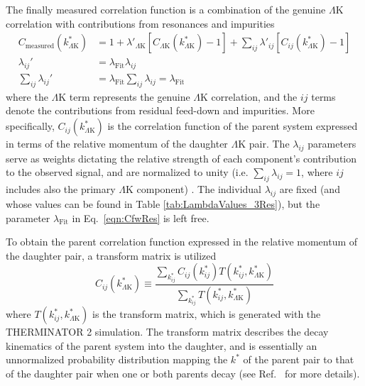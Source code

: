 \documentclass[ALICE,manyauthors]{cernphprep}
\newcommand{\kstar}{$k^{*}$\xspace}
\newcommand{\LamK}{$\Lambda$K\xspace}
\begin{document}
The finally measured correlation function is a combination of the genuine \LamK correlation with contributions from resonances and impurities \cite{Kisiel:2014mma}
\begin{equation}
\begin{aligned}
\label{eqn:CfwRes} 
 C_{\mathrm{measured}}(k^{*}_{\Lambda\mathrm{K}}) &= 1 + \lambda'_{\Lambda\mathrm{K}}[C_{\Lambda\mathrm{K}}(k^{*}_{\Lambda\mathrm{K}}) - 1] + \sum\limits_{ij}  \lambda'_{ij}[C_{ij}(k^{*}_{\Lambda\mathrm{K}})-1] \\
 \lambda_{ij}' &= \lambda_{\mathrm{Fit}}\lambda_{ij} \\
 \sum\limits_{ij}\lambda_{ij}' &=  \lambda_{\mathrm{Fit}}\sum\limits_{ij}\lambda_{ij} = \lambda_{\mathrm{Fit}}
\end{aligned} 
\end{equation}
where the \LamK term represents the genuine \LamK correlation, and the $ij$ terms denote the contributions from residual feed-down and impurities.
More specifically, $C_{ij}(k^{*}_{\Lambda\mathrm{K}})$ is the correlation function of the parent system expressed in terms of the relative momentum of the daughter \LamK pair.  
The $\lambda_{ij}$ parameters serve as weights dictating the relative strength of each component's contribution to the observed signal, and are normalized to unity (i.e. $\sum_{ij} \lambda_{ij} = 1$, where $ij$ includes also the primary \LamK component) {}.
The individual $\lambda_{ij}$ are fixed (and whose values can be found in Table \ref{tab:LambdaValues_3Res}), but the parameter $\lambda_{\mathrm{Fit}}$ in Eq.\ \ref{eqn:CfwRes} is left free.


To obtain the parent correlation function expressed in the relative momentum of the daughter pair, a transform matrix is utilized
\begin{equation}
  C_{ij}(k^{*}_{\Lambda\mathrm{K}}) \equiv \frac{\sum\limits_{k^{*}_{ij}} C_{ij}\left(k^{*}_{ij}\right) T\left(k^{*}_{ij},k^{*}_{\Lambda\mathrm{K}}\right)}{\sum\limits_{k^{*}_{ij}} T\left(k^{*}_{ij},k^{*}_{\Lambda\mathrm{K}}\right)}
\label{eqn:ResidualsTransform}
\end{equation}
where $T(k^{*}_{ij},k^{*}_{\Lambda\mathrm{K}})$ is the transform matrix, which is generated with the THERMINATOR 2 \cite{Chojnacki:2011hb} simulation. 
The transform matrix describes the decay kinematics of the parent system into the daughter, and is essentially an unnormalized probability distribution mapping the \kstar of the parent pair to that of the daughter pair when one or both parents decay (see Ref.\ \cite{Kisiel:2014mma} for more details).
\end{document}

